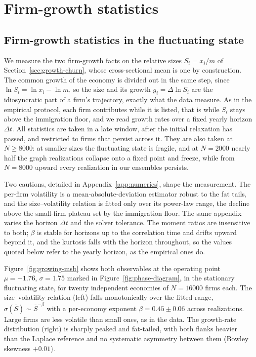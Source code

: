 \chapter{Firm-growth statistics}
\label{chap:firmgrowth}

\section{Firm-growth statistics in the fluctuating state}
\label{sec:growing-observables}

We measure the two firm-growth facts on the relative sizes $S_i = x_i/m$ of
Section~\ref{sec:growth-churn}, whose
cross-sectional mean is one by construction. The common growth of the economy is divided
out in the same step, since $\ln S_i = \ln x_i - \ln m$, so the size and its
growth $g_i = \Delta \ln S_i$ are the idiosyncratic part of a firm's trajectory, exactly
what the data measure. As in the empirical protocol, each firm contributes while it
is listed, that is while $S_i$ stays above the immigration floor, and we read growth
rates over a fixed yearly horizon $\Delta t$. All
statistics are taken in a late window, after the initial relaxation has passed, and
restricted to firms that persist across it. They are also taken at $N \ge 8000$: at
smaller sizes the fluctuating state is fragile, and at $N = 2000$ nearly half the graph
realizations collapse onto a fixed point and freeze, while from $N = 8000$ upward every
realization in our ensembles persists.

Two cautions, detailed in Appendix~\ref{app:numerics}, shape the measurement. The
per-firm volatility is a mean-absolute-deviation estimator robust to the fat tails, and
the size--volatility relation is fitted only over its power-law range, the decline above
the small-firm plateau set by the immigration floor. The same appendix varies the
horizon $\Delta t$ and the solver tolerance. The moment ratios are insensitive to both;
$\beta$ is stable for horizons up to the correlation time and drifts upward beyond it,
and the kurtosis falls with the horizon throughout, so the values quoted below refer to
the yearly horizon, as the empirical ones do.

Figure~\ref{fig:growing-msb} shows both observables at the operating point
$\mu = -1.76$, $\sigma = 1.75$ marked in Figure~\ref{fig:phase-diagram}, in the
stationary fluctuating state, for twenty independent economies of $N = 16000$ firms
each. The size--volatility relation (left) falls
monotonically over the fitted range, $\sigma(\bar S) \sim \bar S^{-\beta}$ with a
per-economy exponent
$\beta = 0.45 \pm 0.06$ across realizations. Large firms are less volatile than small ones, as in the
data. The growth-rate distribution (right) is
sharply peaked and fat-tailed, with both flanks heavier than the Laplace reference and
no systematic asymmetry between them (Bowley skewness $+0.01$).

